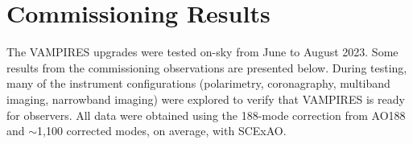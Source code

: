 \section{Commissioning Results}\label{sec:firstlight}

The VAMPIRES upgrades were tested on-sky from June to August 2023. Some results from the commissioning observations are presented below. During testing, many of the instrument configurations (polarimetry, coronagraphy, multiband imaging, narrowband imaging) were explored to verify that VAMPIRES is ready for observers. All data were obtained using the 188-mode correction from AO188 and $\sim$1,100 corrected modes, on average, with SCExAO.




